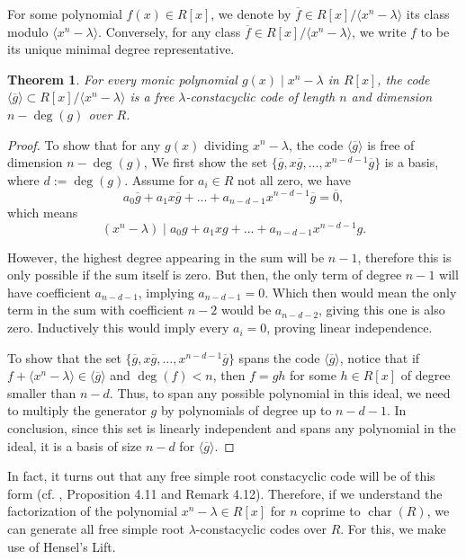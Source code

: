 \documentclass[a4paper, 12pt]{amsart}
\newtheorem{thm}[lemma]{Theorem}
\theoremstyle{definition}
\newcommand{\id}[1]{\langle #1 \rangle}
\newcommand{\lm}{\lambda}
\DeclareMathOperator{\Char}{char}
\numberwithin{equation}{section}
\numberwithin{table}{section}
\begin{document}
For some polynomial $f(x) \in R[x]$, we denote by $\overline f \in R[x]/\id{x^n-\lm}$ its class modulo $\id{x^n-\lm}$. Conversely, for any class $\overline f \in R[x]/\id{x^n-\lm}$, we write $f$ to be its unique minimal degree representative.

\begin{thm}\label{freee}
    For every monic polynomial $g(x) \mid x^n-\lm$ in $R[x]$, the code $\langle \overline g \rangle \subset R[x]/\langle x^n-\lm \rangle$ is a free $\lm$-constacyclic code of length $n$ and dimension $n-\deg(g)$ over $R$.
\end{thm}

\begin{proof}

    To show that for any $g(x)$ dividing $x^n-\lm$, the code $\id{\overline g}$ is free of dimension $n-\deg(g)$, We first show the set $\{\overline g,x\overline g,...,x^{n-d-1}\overline g\}$ is a basis, where $d := \deg(g)$. Assume for $a_i \in R$ not all zero, we have
    \[a_0\overline g + a_1x\overline g + ...+a_{n-d-1}x^{n-d-1}\overline g = \overline 0,\] which means
    \[(x^n-\lm)\mid  a_0g +a_1xg +...+a_{n-d-1}x^{n-d-1}g.\]

    However, the highest degree appearing in the sum will be $n-1$, therefore this is only possible if the sum itself is zero. But then, the only term of degree $n-1$ will have coefficient $a_{n-d-1}$, implying $a_{n-d-1}=0$. Which then would mean the only term in the sum with coefficient $n-2$ would be $a_{n-d-2}$, giving this one is also zero. Inductively this would imply every $a_i = 0$, proving linear independence.

   To show that the set $\{\overline g,x\overline g,...,x^{n-d-1}\overline g\}$ spans the code $\langle \overline{g} \rangle$, notice that if $f + \langle x^n-\lm \rangle \in \langle \overline{g} \rangle$ and $\deg(f) <n$, then $f = gh$ for some $h \in R[x]$ of degree smaller than $ n-d$. Thus, to span any possible polynomial in this ideal, we need to multiply the generator $g$ by polynomials of degree up to $n-d-1$. In conclusion, since this set is linearly independent and spans any polynomial in the ideal, it is a basis of size $n-d$ for $\langle \overline g \rangle$.
\end{proof}

In fact, it turns out that any free simple root constacyclic code will be of this form (cf. \cite{Norton2000-it}, Proposition 4.11 and Remark 4.12). Therefore, if we understand the factorization of the polynomial $x^n-\lm \in R[x]$ for $n$ coprime to $\Char(R)$, we can generate all free simple root $\lm$-constacyclic codes over $R$. For this, we make use of Hensel's Lift.
\end{document}
